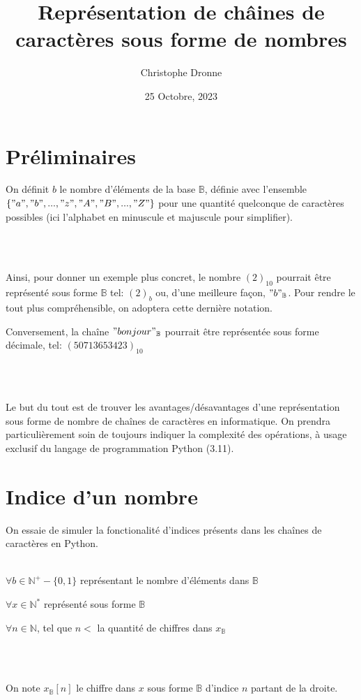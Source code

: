 \documentclass[a4paper, 12pt]{article}
\title{\vspace{-4cm}Représentation de châines de caractères sous forme de nombres}
\author{Christophe Dronne}
\date{25 Octobre, 2023}
\begin{document}
\maketitle

\section*{Préliminaires}
On définit $b$ le nombre d'éléments de la base $\mathbb{B}$, définie avec l'ensemble
$\{"a", "b", ..., "z", "A", "B", ..., "Z"\}$ pour une quantité quelconque de caractères possibles (ici l'alphabet en minuscule et majuscule pour simplifier).

\\\

Ainsi, pour donner un exemple plus concret, le nombre $(2)_{10}$ pourrait être représenté sous forme $\mathbb{B}$ tel: $(2)_{b}$ ou, d'une meilleure façon, $"b"_{\mathbb{B}}$. Pour rendre le tout plus compréhensible, on adoptera cette dernière notation.

Conversement, la chaîne $"bonjour"_{\mathbb{B}}$ pourrait être
représentée sous forme décimale, tel: $(50713653423)_{10}$

\\\

Le but du tout est de trouver les avantages/désavantages d'une représentation sous forme de nombre de chaînes de caractères en informatique. On prendra particulièrement soin de toujours indiquer la complexité des opérations, à usage exclusif du langage de programmation Python (3.11).

\section*{Indice d'un nombre}
On essaie de simuler la fonctionalité d'indices présents dans les chaînes de caractères en Python. \\\

$\forall b \in \mathbb{N}^{+} - \{0, 1\}$ représentant le nombre d'éléments dans
$\mathbb{B}$

$\forall x \in \mathbb{N}^*$ représenté sous forme $\mathbb{B}$

$\forall n \in \mathbb{N}$, tel que $n <$ la quantité de chiffres dans $x_{\mathbb{B}}$

\\\

On note $x_{\mathbb{B}}[n]$ le chiffre dans $x$ sous forme $\mathbb{B}$ d'indice $n$ partant de la droite.
\end{document}
